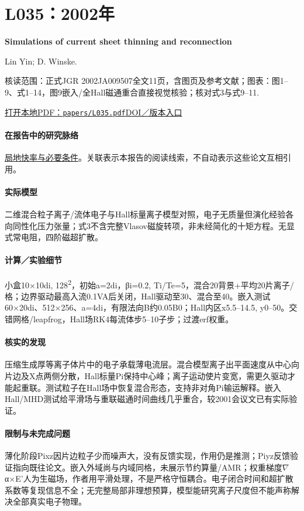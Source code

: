 \documentclass[UTF8,a4paper,11pt,openany,fontset=fandol]{ctexbook}
\begin{document}
\section{L035：2002年}\label{paper:L035}

\textbf{Simulations of current sheet thinning and reconnection}\citep{L035}\

Lin Yin;  D. Winske.

\textsf{核读范围：}正式JGR 2002JA009507全文11页，含图页及参考文献；\textsf{图表：}图1–9、式1–14，图9嵌入/全Hall磁通重合直接视觉核验；核对式3与式9–11.

\href{run:../papers/L035.pdf}{打开本地PDF：\texttt{papers/L035.pdf}}\quad\href{https://doi.org/10.1029/2002ja009507}{DOI／版本入口}

\paragraph{在报告中的研究脉络}\hyperref[story:fast]{局地快率与必要条件}。关联表示本报告的阅读线索，不自动表示这些论文互相引用。

\paragraph{实际模型}二维混合粒子离子/流体电子与Hall标量离子模型对照，电子无质量但演化经验各向同性化压力张量；式3不含完整Vlasov磁旋转项，非未经简化的十矩方程。无显式常电阻，四阶磁超扩散。

\paragraph{计算／实验细节}小盒10×10di, 128\textsuperscript{2}，初始a=2di，βi=0.2, Ti/Te=5，混合20背景+平均20片离子/格；边界驱动最高入流0.1VA后关闭，Hall驱动至30、混合至40。嵌入测试60×20di、512×256、a=4di，有限法向B约0.05B0；Hall内区x5.5–14.5, y0–50。交错网格/leapfrog，Hall场RK4每流体步5–10子步；过渡erf权重。

\paragraph{核实的发现}压缩生成厚等离子体片中的电子承载薄电流层。混合模型离子出平面速度从中心向片边及X点两侧分散，Hall标量Pi保持中心峰；离子运动使片变宽，需更久驱动才能起重联。测试粒子在Hall场中恢复混合形态，支持非对角Pi输运解释。嵌入Hall/MHD测试给平滑场与重联磁通时间曲线几乎重合，较2001会议文已有实际验证。

\paragraph{限制与未完成问题}薄化阶段Pixz因片边粒子少而噪声大，没有反馈实现，作用仍是推测；Piyz反馈验证指向既往论文。嵌入外域尚与内域同格，未展示节约算量/AMR；权重梯度\ensuremath{\nabla}α×E'人为生磁场，作者用平滑处理，不是严格守恒耦合。电子闭合时间和超扩散系数等复现信息不全；无完整局部非理想预算，模型能研究离子尺度但不能声称解决全部真实电子物理。
\end{document}
